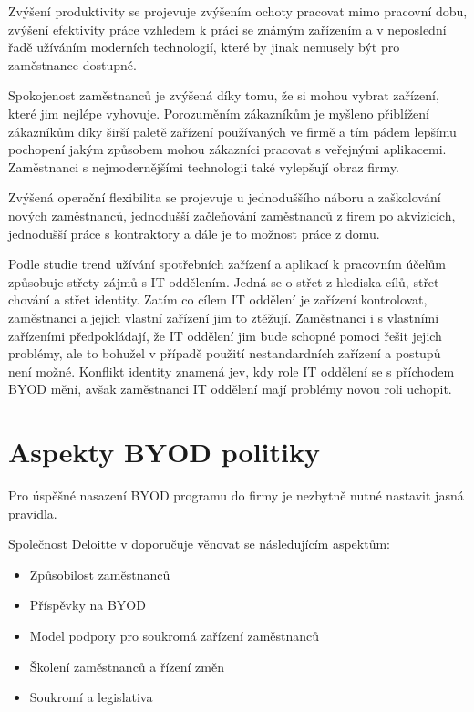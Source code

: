 Zvýšení produktivity se projevuje zvýšením ochoty pracovat mimo pracovní dobu, zvýšení efektivity práce vzhledem k práci se známým zařízením a v neposlední řadě užíváním moderních technologií, které by jinak nemusely být pro zaměstnance dostupné. 

Spokojenost zaměstnanců je zvýšená díky tomu, že si mohou vybrat zařízení, které jim nejlépe vyhovuje. Porozuměním zákazníkům je myšleno přiblížení zákazníkům díky širší paletě zařízení používaných ve firmě a tím pádem lepšímu pochopení jakým způsobem mohou zákazníci pracovat s veřejnými aplikacemi. Zaměstnanci s nejmodernějšími technologii také vylepšují obraz firmy.

Zvýšená operační flexibilita se projevuje u jednoduššího náboru a zaškolování nových zaměstnanců, jednodušší začleňování zaměstnanců z firem po akvizicích, jednodušší práce s kontraktory a dále je to možnost práce z domu.


Podle studie \cite{koch2014consumerization} trend užívání spotřebních zařízení a aplikací k pracovním účelům způsobuje střety zájmů s IT oddělením. Jedná se o střet z hlediska cílů, střet chování a střet identity. Zatím co cílem IT oddělení je zařízení kontrolovat, zaměstnanci a jejich vlastní zařízení jim to ztěžují. Zaměstnanci i s vlastními zařízeními předpokládají, že IT oddělení jim bude schopné pomoci řešit jejich problémy, ale to bohužel v případě použití nestandardních zařízení a postupů není možné. Konflikt identity znamená jev, kdy role IT oddělení se s příchodem BYOD mění, avšak zaměstnanci IT oddělení mají problémy novou roli uchopit.

\section{Aspekty BYOD politiky}

Pro úspěšné nasazení BYOD programu do firmy je nezbytně nutné nastavit jasná pravidla.

Společnost Deloitte v \cite{DeloitteBYOD} doporučuje věnovat se následujícím aspektům:
\begin{itemize}\label{deloitte_aspekty}
\item Způsobilost zaměstnanců
\item Příspěvky na BYOD
\item Model podpory pro soukromá zařízení zaměstnanců
\item Školení zaměstnanců a řízení změn
\item Soukromí a legislativa
\end{itemize}


